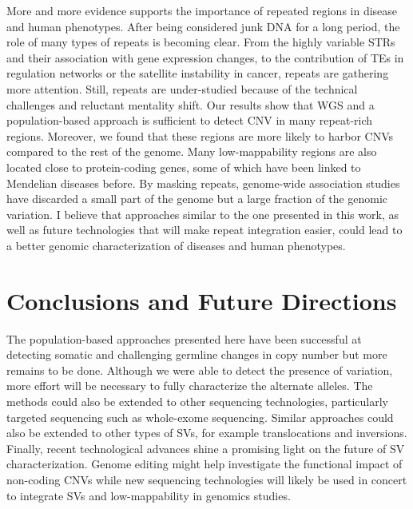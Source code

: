 More and more evidence supports the importance of repeated regions in disease and human phenotypes.
After being considered junk DNA for a long period, the role of many types of repeats is becoming clear.
From the highly variable STRs and their association with gene expression changes\cite{Gymrek2016}, to the contribution of TEs in regulation networks\cite{Bourque2009} or the satellite instability in cancer\cite{Kim2013}, repeats are gathering more attention.
Still, repeats are under-studied because of the technical challenges and reluctant mentality shift.
Our results show that WGS and a population-based approach is sufficient to detect CNV in many repeat-rich regions.
Moreover, we found that these regions are more likely to harbor CNVs compared to the rest of the genome.
Many low-mappability regions are also located close to protein-coding genes, some of which have been linked to Mendelian diseases before.
By masking repeats, genome-wide association studies have discarded a small part of the genome but a large fraction of the genomic variation.
I believe that approaches similar to the one presented in this work, as well as future technologies that will make repeat integration easier, could lead to a better genomic characterization of diseases and human phenotypes.




\chapter{Conclusions and Future Directions}
\label{chap:conc}

The population-based approaches presented here have been successful at detecting somatic and challenging germline changes in copy number but more remains to be done.
Although we were able to detect the presence of variation, more effort will be necessary to fully characterize the alternate alleles.
The methods could also be extended to other sequencing technologies, particularly targeted sequencing such as whole-exome sequencing.
Similar approaches could also be extended to other types of SVs, for example translocations and inversions.
Finally, recent technological advances shine a promising light on the future of SV characterization.
Genome editing might help investigate the functional impact of non-coding CNVs while new sequencing technologies will likely be used in concert to integrate SVs and low-mappability in genomics studies.

